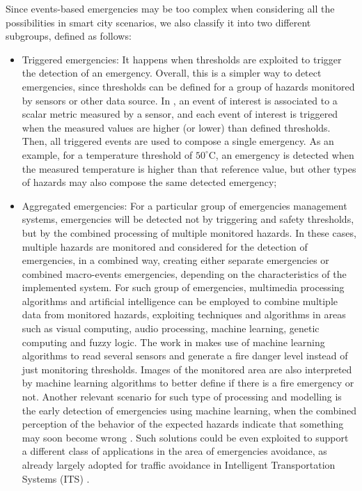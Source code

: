 \begin{refsection}
Since events-based emergencies may be too complex when considering all the possibilities in smart city scenarios, we also classify it into two different subgroups, defined as follows:

\begin{itemize}
  \item Triggered emergencies: It happens when thresholds are exploited to trigger the detection of an emergency. Overall, this is a simpler way to detect emergencies, since thresholds can be defined for a group of hazards monitored by sensors or other data source. In \cite{emergenciesmetric2}, an event of interest is associated to a scalar metric measured by a sensor, and each event of interest is triggered when the measured values are higher (or lower) than defined thresholds. Then, all triggered events are used to compose a single emergency. As an example, for a temperature threshold of $50^{\circ}$C, an emergency is detected when the measured temperature is higher than that reference value, but other types of hazards may also compose the same detected emergency;
  
  \item Aggregated emergencies: For a particular group of emergencies management systems, emergencies will be detected not by triggering and safety thresholds, but by the combined processing of multiple monitored hazards. In these cases, multiple hazards are monitored and considered for the detection of emergencies, in a combined way, creating either separate emergencies or combined macro-events emergencies, depending on the characteristics of the implemented system. For such group of emergencies, multimedia processing algorithms and artificial intelligence can be employed to combine multiple data from monitored hazards, exploiting techniques and algorithms in areas such as visual computing, audio processing, machine learning, genetic computing and fuzzy logic. The work in \cite{SultanMahmud2017} makes use of machine learning algorithms to read several sensors and generate a fire danger level instead of just monitoring thresholds. Images of the monitored area are also interpreted by machine learning algorithms to better define if there is a fire emergency or not. Another relevant scenario for such type of processing and modelling is the early detection of emergencies using machine learning, when the combined perception of the behavior of the expected hazards indicate that something may soon become wrong \cite{machine1}. Such solutions could be even exploited to support a different class of applications in the area of emergencies avoidance, as already largely adopted for traffic avoidance in Intelligent Transportation Systems (ITS) \cite{machine2}.
\end{itemize}


\end{refsection}
